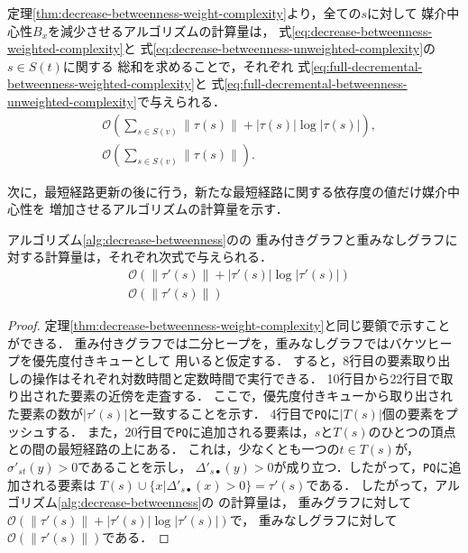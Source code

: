 定理\ref{thm:decrease-betweenness-weight-complexity}より，全ての$s$に対して
媒介中心性$B_x$を減少させるアルゴリズムの計算量は，
式\eqref{eq:decrease-betweenness-weighted-complexity}と
式\eqref{eq:decrease-betweenness-unweighted-complexity}の$s\in S(t)$に関する
総和を求めることで，それぞれ
式\eqref{eq:full-decremental-betweenness-weighted-complexity}と
式\eqref{eq:full-decremental-betweenness-unweighted-complexity}で与えられる．
\begin{align}
  &\mathcal{O}\left(\sum_{s\in S(v)}\|\tau(s)\|+|\tau(s)|\log|\tau(s)|\right),
  \label{eq:full-decremental-betweenness-weighted-complexity} \\
  &\mathcal{O}\left(\sum_{s\in S(v)}\|\tau(s)\|\right).
  \label{eq:full-decremental-betweenness-unweighted-complexity}
\end{align}

次に，最短経路更新の後に行う，新たな最短経路に関する依存度の値だけ媒介中心性を
増加させるアルゴリズムの計算量を示す．

\begin{theorem}
  \label{thm:increase-betweenness-weight-complexity}
  アルゴリズム\ref{alg:decrease-betweenness}のの
  重み付きグラフと重みなしグラフに対する計算量は，それぞれ次式で与えられる．
  \begin{align}
    &\mathcal{O}\left(\|\tau'(s)\|+|\tau'(s)|\log|\tau'(s)|\right)
    \label{eq:increase-betweenness-weighted-complexity} \\
    &\mathcal{O}\left(\|\tau'(s)\|\right)
    \label{eq:increase-betweenness-unweighted-complexity}
  \end{align}
\end{theorem}
\begin{proof}
  定理\ref{thm:decrease-betweenness-weight-complexity}と同じ要領で示すことができる．
  重み付きグラフでは二分ヒープを，重みなしグラフではバケツヒープを優先度付きキューとして
  用いると仮定する．
  すると，8行目の要素取り出しの操作はそれぞれ対数時間と定数時間で実行できる．
  10行目から22行目で取り出された要素の近傍を走査する．
  ここで，優先度付きキューから取り出された要素の数が$|\tau'(s)|$と一致することを示す．
  4行目で\texttt{PQ}に$|T(s)|$個の要素をプッシュする．
  また，20行目で\texttt{PQ}に追加される要素は，$s$と$T(s)$のひとつの頂点との間の最短経路の上にある．
  これは，少なくとも一つの$t\in T(s)$が，$\sigma'_{st}(y)>0$であることを示し，
  $\Delta'_{s\bullet}(y)>0$が成り立つ．したがって，\texttt{PQ}に追加される要素は
  $T(s)\cup\{x|\Delta'_{s\bullet}(x)>0\}=\tau'(s)$である．
  したがって，アルゴリズム\ref{alg:decrease-betweenness}の
  の計算量は，
  重みグラフに対して$\mathcal{O}(\|\tau'(s)\|+|\tau'(s)|\log|\tau'(s)|)$で，
  重みなしグラフに対して$\mathcal{O}(\|\tau'(s)\|)$である．
\end{proof}

